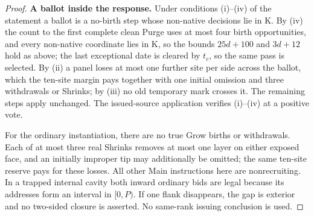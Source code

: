 \begin{proof}
\textbf{A ballot inside the response.} Under conditions (i)--(iv) of the statement a ballot is a no-birth step whose non-native decisions lie in K. By (iv) the count to the first complete clean Purge uses at most four birth opportunities, and every non-native coordinate lies in K, so the bounds \(25d+100\) and \(3d+12\) hold as above; the last exceptional date is cleared by \(t_c\), so the same pass is selected. By (ii) a panel loses at most one further site per side across the ballot, which the ten-site margin pays together with one initial omission and three withdrawals or Shrinks; by (iii) no old temporary mark crosses it. The remaining steps apply unchanged. The issued-source application verifies (i)--(iv) at a positive vote.

For the ordinary instantiation, there are no true Grow births or withdrawals. Each of at most three real Shrinks removes at most one layer on either exposed face, and an initially improper tip may additionally be omitted; the same ten-site reserve pays for these losses. All other Main instructions here are nonrecruiting. In a trapped internal cavity both inward ordinary bids are legal because its addresses form an interval in \([0,P)\). If one flank disappears, the gap is exterior and no two-sided closure is asserted. No same-rank issuing conclusion is used.
\end{proof}

